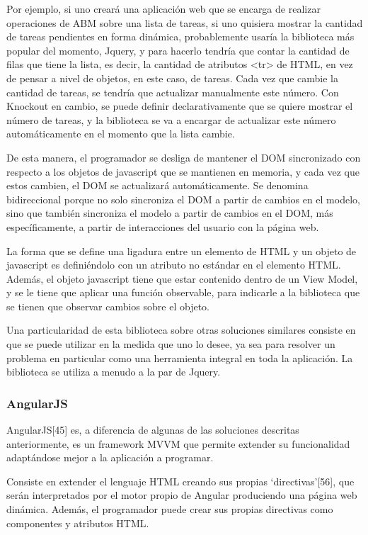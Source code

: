\documentclass[doc,helv,longtable]{article}
\begin{document}
Por ejemplo, si uno creará una aplicación web que se encarga de realizar operaciones de ABM sobre una lista de tareas, si uno quisiera mostrar la cantidad de tareas pendientes en forma dinámica, probablemente usaría la biblioteca más popular del momento, Jquery, y para hacerlo tendría que contar la cantidad de filas que tiene la lista, es decir, la cantidad de atributos <tr> de HTML, en vez de pensar a nivel de objetos, en este caso, de tareas. Cada vez que cambie la cantidad de tareas, se tendría que actualizar manualmente este número. Con Knockout en cambio, se puede definir declarativamente que se quiere mostrar el número de tareas, y la biblioteca se va a encargar de actualizar este número automáticamente en el momento que la lista cambie. 

De esta manera, el programador se desliga de mantener el DOM sincronizado con respecto a los objetos de javascript que se mantienen en memoria, y cada vez que estos cambien, el DOM se actualizará automáticamente. Se denomina bidireccional porque no solo sincroniza el DOM a partir de cambios en el modelo, sino que también sincroniza el modelo a partir de cambios en el DOM, más específicamente, a partir de interacciones del usuario con la página web. 

La forma que se define una ligadura entre un elemento de HTML y un objeto de javascript es definiéndolo con un atributo no estándar en el elemento HTML. Además, el objeto javascript tiene que estar contenido dentro de un View Model, y se le tiene que aplicar una función observable, para indicarle a la biblioteca que se tienen que observar cambios sobre el objeto.

Una particularidad de esta biblioteca sobre otras soluciones similares consiste en que se puede utilizar en la medida que uno lo desee, ya sea para resolver un problema en particular como una herramienta integral en toda la aplicación. La biblioteca se utiliza a menudo a la par de Jquery. 

\subsubsection{AngularJS}
AngularJS[45] es, a diferencia de algunas de las soluciones descritas anteriormente, es un framework MVVM que permite extender su funcionalidad adaptándose mejor a la aplicación a programar. 

Consiste en extender el lenguaje HTML creando sus propias ‘directivas’[56], que serán interpretados por el motor propio de Angular produciendo una página web dinámica. Además, el programador puede crear sus propias directivas como componentes y atributos HTML.
\end{document}
